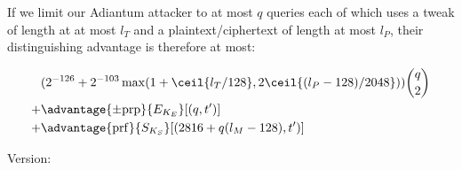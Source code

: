 \documentclass[journal=tosc,preprint,floatrow,submission]{iacrtrans}
\begin{document}
If we limit our Adiantum attacker to at most $q$ queries each of which uses a tweak of length at
at most $l_T$ and a plaintext/ciphertext of length at most $l_P$, their distinguishing advantage
is therefore at most:

\begin{align*}
&( 2^{-126} + 2^{-103}\max(1 + \ceil{l_T/128}, 2\ceil{(l_P - 128)/2048}))\binom{q}{2} \\
+& \advantage{\pm \mathrm{prp}}{E_{K_E}}[(q, t')] \\
+& \advantage{\mathrm{prf}}{S_{K_S}}[(2816 + q(l_M - 128), t')] \\
\end{align*}

Version: \texttt{}
\end{document}
